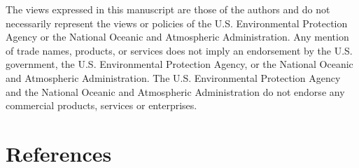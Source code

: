 \documentclass[10pt,letterpaper]{article}
\begin{document}
The views expressed in this manuscript are those of the authors and do
not necessarily represent the views or policies of the U.S.
Environmental Protection Agency or the National Oceanic and Atmospheric
Administration. Any mention of trade names, products, or services does
not imply an endorsement by the U.S. government, the U.S. Environmental
Protection Agency, or the National Oceanic and Atmospheric
Administration. The U.S. Environmental Protection Agency and the
National Oceanic and Atmospheric Administration do not endorse any
commercial products, services or enterprises.

\hypertarget{references}{%
\section*{References}\label{references}}
\end{document}

